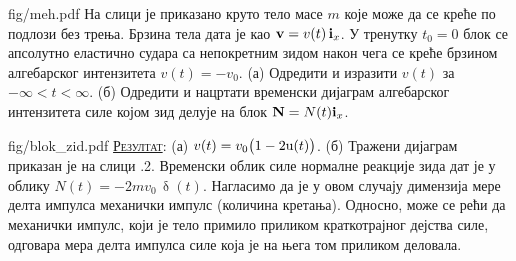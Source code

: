 
\begin{slikaDesno}[.833]{fig/meh.pdf}
\PID 
На слици је приказано круто тело масе $m$ 
које може да се креће по подлози без трења. 
Брзина тела дата је као ${\bf v} = v(t) \, 
{\bf i}_x$. У тренутку $t_0 = 0$ блок се 
апсолутно еластично судара са 
непокретним зидом након чега 
се креће брзином алгебарског интензитета 
$v(t) = -v_0$. (а) Одредити и 
изразити $v(t)$ за $-\infty< t < \infty$. 
(б) Одредити и нацртати временски дијаграм
алгебарског интензитета  
силе којом зид делује на блок ${\bf N} = N(t) 
{\bf i}_x$.
\end{slikaDesno}
\vspace*{5mm}

\begin{slikaDesno}[1]{fig/blok_zid.pdf}
\hspace*{5mm}
\textsc{\underline{Резултат}}:
(а) $v(t) = v_0 \bigl(1 - 2{\rm u}(t)\bigr)$.
(б) Тражени дијаграм приказан је на слици \ID.2.
Временски облик силе нормалне реакције зида дат је у облику 
$N(t) = -2mv_0 \, \updelta(t)$. Нагласимо да је у овом случају димензија
мере делта импулса механички импулс (количина кретања). Односно, може се рећи да механички импулс, 
који је тело примило приликом краткотрајног дејства силе, одговара мера делта импулса силе која је на 
њега том приликом деловала.
\end{slikaDesno}